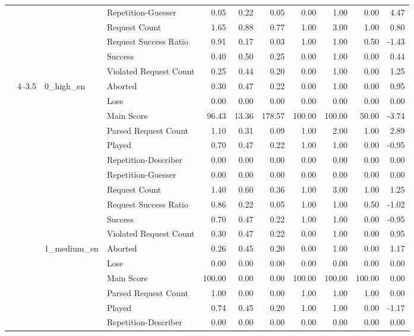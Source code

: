 \begin{tabular}{llllrrrrrrr}
 &  &  & Repetition-Guesser & 0.05 & 0.22 & 0.05 & 0.00 & 1.00 & 0.00 & 4.47 \\
 &  &  & Request Count & 1.65 & 0.88 & 0.77 & 1.00 & 3.00 & 1.00 & 0.80 \\
 &  &  & Request Success Ratio & 0.91 & 0.17 & 0.03 & 1.00 & 1.00 & 0.50 & -1.43 \\
 &  &  & Success & 0.40 & 0.50 & 0.25 & 0.00 & 1.00 & 0.00 & 0.44 \\
 &  &  & Violated Request Count & 0.25 & 0.44 & 0.20 & 0.00 & 1.00 & 0.00 & 1.25 \\
\cline{2-11} \cline{3-11}
 & \multirow[t]{33}{*}{4--3.5} & \multirow[t]{11}{*}{0_high_en} & Aborted & 0.30 & 0.47 & 0.22 & 0.00 & 1.00 & 0.00 & 0.95 \\
 &  &  & Lose & 0.00 & 0.00 & 0.00 & 0.00 & 0.00 & 0.00 & 0.00 \\
 &  &  & Main Score & 96.43 & 13.36 & 178.57 & 100.00 & 100.00 & 50.00 & -3.74 \\
 &  &  & Parsed Request Count & 1.10 & 0.31 & 0.09 & 1.00 & 2.00 & 1.00 & 2.89 \\
 &  &  & Played & 0.70 & 0.47 & 0.22 & 1.00 & 1.00 & 0.00 & -0.95 \\
 &  &  & Repetition-Describer & 0.00 & 0.00 & 0.00 & 0.00 & 0.00 & 0.00 & 0.00 \\
 &  &  & Repetition-Guesser & 0.00 & 0.00 & 0.00 & 0.00 & 0.00 & 0.00 & 0.00 \\
 &  &  & Request Count & 1.40 & 0.60 & 0.36 & 1.00 & 3.00 & 1.00 & 1.25 \\
 &  &  & Request Success Ratio & 0.86 & 0.22 & 0.05 & 1.00 & 1.00 & 0.50 & -1.02 \\
 &  &  & Success & 0.70 & 0.47 & 0.22 & 1.00 & 1.00 & 0.00 & -0.95 \\
 &  &  & Violated Request Count & 0.30 & 0.47 & 0.22 & 0.00 & 1.00 & 0.00 & 0.95 \\
\cline{3-11}
 &  & \multirow[t]{11}{*}{1_medium_en} & Aborted & 0.26 & 0.45 & 0.20 & 0.00 & 1.00 & 0.00 & 1.17 \\
 &  &  & Lose & 0.00 & 0.00 & 0.00 & 0.00 & 0.00 & 0.00 & 0.00 \\
 &  &  & Main Score & 100.00 & 0.00 & 0.00 & 100.00 & 100.00 & 100.00 & 0.00 \\
 &  &  & Parsed Request Count & 1.00 & 0.00 & 0.00 & 1.00 & 1.00 & 1.00 & 0.00 \\
 &  &  & Played & 0.74 & 0.45 & 0.20 & 1.00 & 1.00 & 0.00 & -1.17 \\
 &  &  & Repetition-Describer & 0.00 & 0.00 & 0.00 & 0.00 & 0.00 & 0.00 & 0.00 \\

\end{tabular}
